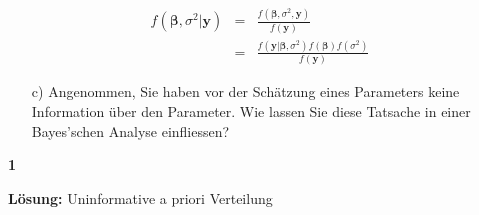 \documentclass{scrartcl}
\newcommand{\points}[1]
{\begin{flushright}\textbf{#1}\end{flushright}}
\begin{document}
\begin{eqnarray}
f(\mathbf{\beta}, \sigma^2 | \mathbf{y}) & = & \frac{f(\mathbf{\beta}, \sigma^2, \mathbf{y})}{f(\mathbf{y})} \nonumber \\
                                         & = & \frac{f(\mathbf{y} | \mathbf{\beta}, \sigma^2)f(\mathbf{\beta})f(\sigma^2)}{f(\mathbf{y})}
\label{LinModAPostProb}
\end{eqnarray}


\clearpage
\pagebreak

\begin{enumerate}
\item[c)] Angenommen, Sie haben vor der Sch\"atzung eines Parameters keine Information \"uber den Parameter. Wie lassen Sie diese Tatsache in einer Bayes'schen Analyse einfliessen?
\end{enumerate}
\points{1}

\noindent\textbf{L\"osung:} Uninformative a priori Verteilung
\end{document}
